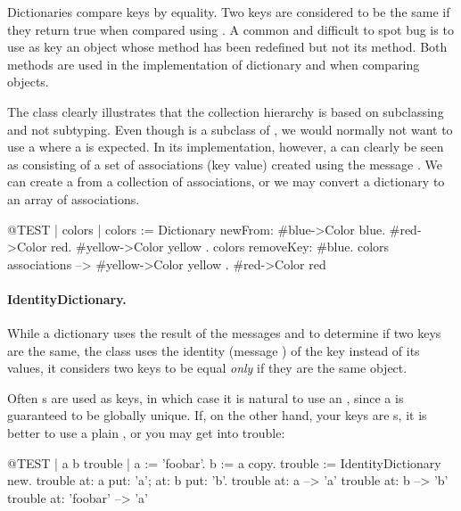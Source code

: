 \documentclass[a4paper,10pt,twoside]{book}
\begin{document}
Dictionaries compare keys by equality. Two keys are considered to be the same if they return true when compared using \ct{=}. A common and difficult to spot bug is to use as key an object whose \ct{=} method has been redefined but not its  method. Both methods are used in the implementation of dictionary and when comparing objects.

The class  clearly illustrates that the collection hierarchy is based on subclassing and not subtyping.  Even though  is a subclass of , we would normally not want to use a  where a  is expected. In its implementation, however, a  can clearly be seen as consisting of a set of associations (key value) created using the message . We can create a  from a collection of associations, or we may convert a dictionary to an array of associations.

\begin{code}{@TEST | colors |}
colors := Dictionary newFrom: { #blue->Color blue. #red->Color red. #yellow->Color yellow }.
colors removeKey: #blue.
colors associations --> {#yellow->Color yellow . #red->Color red}
\end{code}

\paragraph{IdentityDictionary.}
While a dictionary uses the result of the messages \ct{=} and  to determine if two keys are the same, the class  uses the identity (message ) of the key instead of its values, \ie it considers two keys to be equal \emph{only} if they are the same object.

Often s are used as keys, in which case it is natural to use an , since a  is guaranteed to be globally unique.
If, on the other hand, your keys are s, it is better to use a plain , or you may get into trouble:

\begin{code}{@TEST | a b trouble |}
a := 'foobar'.
b := a copy.
trouble := IdentityDictionary new.
trouble at: a put: 'a'; at: b put: 'b'.
trouble at: a          --> 'a'
trouble at: b          --> 'b'
trouble at: 'foobar' --> 'a'
\end{code}
\end{document}
